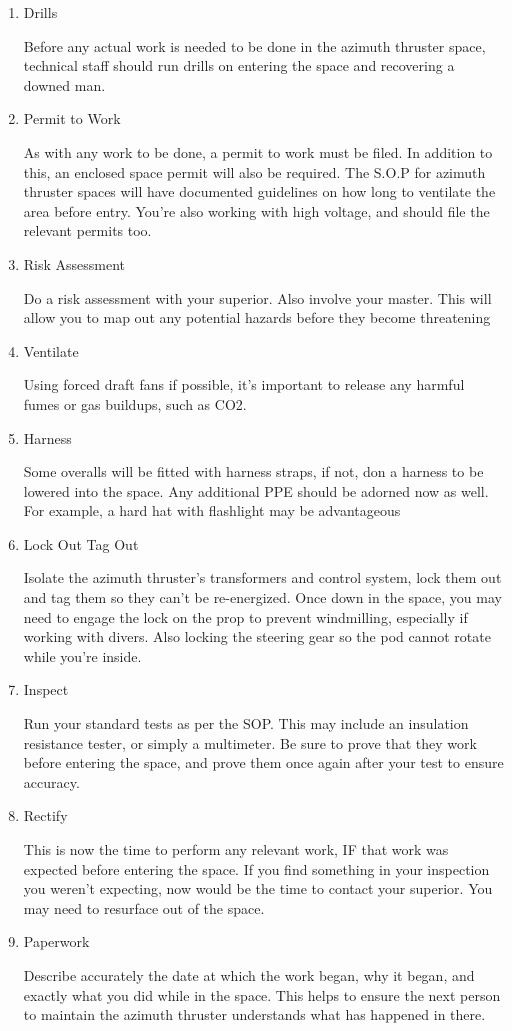 \documentclass[11pt,a4paper]{article}
\begin{document}
\begin{enumerate}
\item Drills

Before any actual work is needed to be done in the azimuth thruster space, technical staff should run drills on entering the space and recovering a downed man.
\item Permit to Work

As with any work to be done, a permit to work must be filed. In addition to this, an enclosed space permit will also be required. The S.O.P for azimuth thruster spaces will have documented guidelines on how long to ventilate the area before entry. You're also working with high voltage, and should file the relevant permits too.
\item Risk Assessment

Do a risk assessment with your superior. Also involve your master. This will allow you to map out any potential hazards before they become threatening
\item Ventilate

Using forced draft fans if possible, it's important to release any harmful fumes or gas buildups, such as CO2.
\item Harness

Some overalls will be fitted with harness straps, if not, don a harness to be lowered into the space. Any additional PPE should be adorned now as well. For example, a hard hat with flashlight may be advantageous
\item Lock Out Tag Out

Isolate the azimuth thruster's transformers and control system, lock them out and tag them so they can't be re-energized. Once down in the space, you may need to engage the lock on the prop to prevent windmilling, especially if working with divers. Also locking the steering gear so the pod cannot rotate while you're inside.
\item Inspect

Run your standard tests as per the SOP. This may include an insulation resistance tester, or simply a multimeter. Be sure to prove that they work before entering the space, and prove them once again after your test to ensure accuracy.
\item Rectify

This is now the time to perform any relevant work, IF that work was expected before entering the space. If you find something in your inspection you weren't expecting, now would be the time to contact your superior. You may need to resurface out of the space.
\item Paperwork

Describe accurately the date at which the work began, why it began,  and exactly what you did while in the space. This helps to ensure the next person to maintain the azimuth thruster understands what has happened in there.
\end{enumerate}
\newpage
\end{document}
